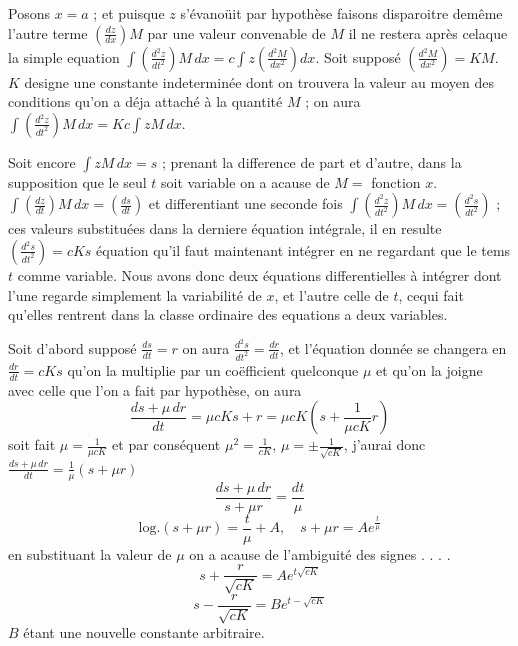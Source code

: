 \documentclass[11pt,a4paper]{article}
\begin{document}


Posons $x=a$ ; et puisque $z$ s'évanoüit par hypothèse faisons disparoitre demême
l'autre terme $\left(\frac{dz}{dx}\right)M$ par une valeur convenable de $M$ il ne restera après celaque la
simple equation $\int\left(\frac{d^{2}z}{dt^{2}}\right)M\,dx=c\int z\left(\frac{d^{2}M}{dx^{2}}\right)dx$. Soit supposé $\left(\frac{d^{2}M}{dx^{2}}\right)=KM$. $K$ designe
une constante indeterminée dont on trouvera la valeur au moyen des conditions
qu'on a déja attaché à la quantité $M$ ; on aura $\int\left(\frac{d^{2}z}{dt^{2}}\right)M\,dx=Kc\int zM\,dx$.

Soit encore $\int zM\,dx=s$ ; prenant la difference de part et d'autre,
dans la supposition que le seul $t$ soit  variable on a acause de
$M=$ fonction $x$. $\int\left(\frac{dz}{dt}\right)M\,dx=\left(\frac{ds}{dt}\right)$ et differentiant une seconde fois
$\int\left(\frac{d^{2}z}{dt^{2}}\right)M\,dx=\left(\frac{d^{2}s}{dt^{2}}\right)$ ; ces valeurs substituées dans la derniere équation intégrale,
il en resulte $\left(\frac{d^{2}s}{dt^{2}}\right)=cKs$ équation qu'il faut maintenant intégrer en ne
regardant que le tems $t$  comme variable. Nous avons donc deux
équations differentielles à intégrer dont l'une regarde simplement la variabilité
de $x$, et l'autre celle de $t$, cequi fait qu'elles rentrent dans la classe
ordinaire des equations a deux variables.

Soit d'abord supposé $\frac{ds}{dt}=r$ on aura $\frac{d^{2}s}{dt^{2}}=\frac{dr}{dt}$, et l'équation donnée se
changera en $\frac{dr}{dt}=cKs$ qu'on la multiplie par un coëfficient quelconque
$\mu$ et qu'on la joigne avec celle que l'on a fait par hypothèse, on aura
\[ \frac{ds+\mu\,dr}{dt}=\mu cKs+r=\mu cK\left(s+\frac{1}{\mu cK}r\right) \]
soit fait $\mu=\frac{1}{\mu cK}$ et par conséquent
$\mu^{2}=\frac{1}{cK}$, $\mu=\pm\frac{1}{\sqrt{cK}}$, j'aurai donc $\frac{ds+\mu\,dr}{dt}=\frac{1}{\mu}(s+\mu r)$
\[ \frac{ds+\mu\,dr}{s+\mu r}=\frac{dt}{\mu} \]
\[ \text{log.}(s+\mu r)=\frac{t}{\mu}+A,\quad s+\mu r=Ae^{\frac{t}{\mu}} \]
en substituant la valeur de $\mu$ on a acause de l'ambiguité des signes . . . .
\[ s+\frac{r}{\sqrt{cK}}=Ae^{t\sqrt{cK}} \]
\[ s-\frac{r}{\sqrt{cK}}=Be^{t-\sqrt{cK}} \]
$B$ étant une nouvelle constante arbitraire.
\end{document}
